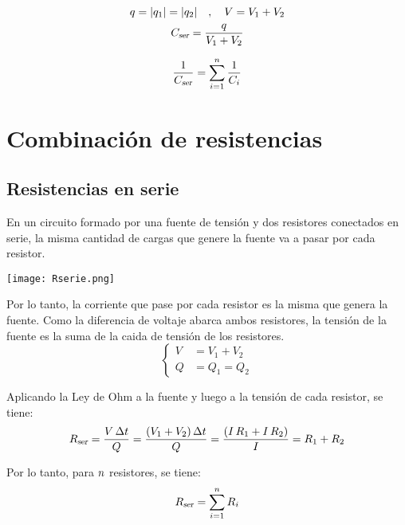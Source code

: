 \documentclass[a5paper,12pt,twoside]{book}
\begin{document}
\begin{gather*}
    q = {\left| {q_1} \right|} = {\left| {q_2} \right|} \quad , \quad V = V_1 + V_2
    \\
    {{C}_\textsl{{ser}}} = \frac{q}{V_1 + V_2}
\end{gather*}

\begin{equation*}
    \frac{1}{{{C}_\textsl{{ser}}}} = \sum_{i=1}^n \frac{1}{C_i}
\end{equation*}


\section{Combinación de resistencias}


\subsection*{Resistencias en serie}

En un circuito formado por una fuente de tensión y dos resistores conectados en serie, la misma cantidad de cargas que genere la fuente va a pasar por cada resistor.

\begin{center}
    \texttt{[image: Rserie.png]}
\end{center}

Por lo tanto, la corriente que pase por cada resistor es la misma que genera la fuente. Como la diferencia de voltaje abarca ambos resistores, la tensión de la fuente es la suma de la caida de tensión de los resistores.
\begin{equation*}
    \left\{
    \begin{aligned}
        V &= V_1 + V_2
        \\
        Q &= Q_1 = Q_2
    \end{aligned}
    \right.
\end{equation*}

Aplicando la Ley de Ohm a la fuente y luego a la tensión de cada resistor, se tiene:
\begin{equation*}
    {{R}_\textsl{{ser}}} = \frac{V \, \Delta t}{Q} = \frac{\left(V_1 + V_2\right) \Delta t}{Q} = \frac{\left(I \, R_1 + I \, R_2\right)}{I} = R_1 + R_2
\end{equation*}

Por lo tanto, para $n$ resistores, se tiene:
\begin{equation*}
    {{R}_\textsl{{ser}}} = \sum_{i=1}^n R_i
\end{equation*}
\end{document}
